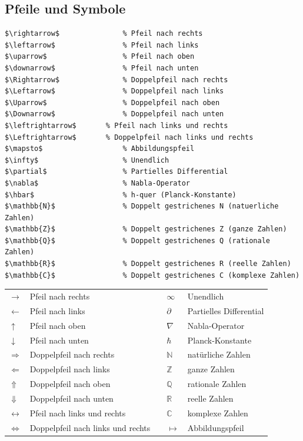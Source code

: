 \documentclass[12pt,a4paper]{article}
\begin{document}
\subsection{Pfeile und Symbole}

\begin{lstlisting}[style=latex]
$\rightarrow$    			% Pfeil nach rechts
$\leftarrow$     			% Pfeil nach links
$\uparrow$       			% Pfeil nach oben
$\downarrow$     			% Pfeil nach unten
$\Rightarrow$    			% Doppelpfeil nach rechts
$\Leftarrow$     			% Doppelpfeil nach links
$\Uparrow$       			% Doppelpfeil nach oben
$\Downarrow$     			% Doppelpfeil nach unten
$\leftrightarrow$ 		% Pfeil nach links und rechts
$\Leftrightarrow$ 		% Doppelpfeil nach links und rechts
$\mapsto$        			% Abbildungspfeil
$\infty$         			% Unendlich
$\partial$      			% Partielles Differential
$\nabla$         			% Nabla-Operator
$\hbar$          			% h-quer (Planck-Konstante)
$\mathbb{N}$     			% Doppelt gestrichenes N (natuerliche Zahlen)
$\mathbb{Z}$     			% Doppelt gestrichenes Z (ganze Zahlen)
$\mathbb{Q}$     			% Doppelt gestrichenes Q (rationale Zahlen)
$\mathbb{R}$     			% Doppelt gestrichenes R (reelle Zahlen)
$\mathbb{C}$     			% Doppelt gestrichenes C (komplexe Zahlen)
\end{lstlisting}

\begin{ausgabe}
\begin{tabular}{l l c l l}
	$\rightarrow$ & Pfeil nach rechts & & $\infty$ & Unendlich\\
	$\leftarrow$ & Pfeil nach links & & $\partial$ & Partielles Differential\\
	$\uparrow$ & Pfeil nach oben & & $\nabla$ & Nabla-Operator\\
	$\downarrow$ & Pfeil nach unten & & $\hbar$ & Planck-Konstante\\
	$\Rightarrow$ & Doppelpfeil nach rechts & & $\mathbb{N}$ & natürliche Zahlen\\
	$\Leftarrow$ & Doppelpfeil nach links & & $\mathbb{Z}$ & ganze Zahlen\\
	$\Uparrow$ & Doppelpfeil nach oben & & $\mathbb{Q}$ & rationale Zahlen\\
	$\Downarrow$ & Doppelpfeil nach unten & & $\mathbb{R}$ & reelle Zahlen\\
	$\leftrightarrow$ & Pfeil nach links und rechts & & $\mathbb{C}$ & komplexe Zahlen\\
	$\Leftrightarrow$ & Doppelpfeil nach links und rechts & & $\mapsto$ & Abbildungspfeil
\end{tabular}
\end{ausgabe}
\end{document}
